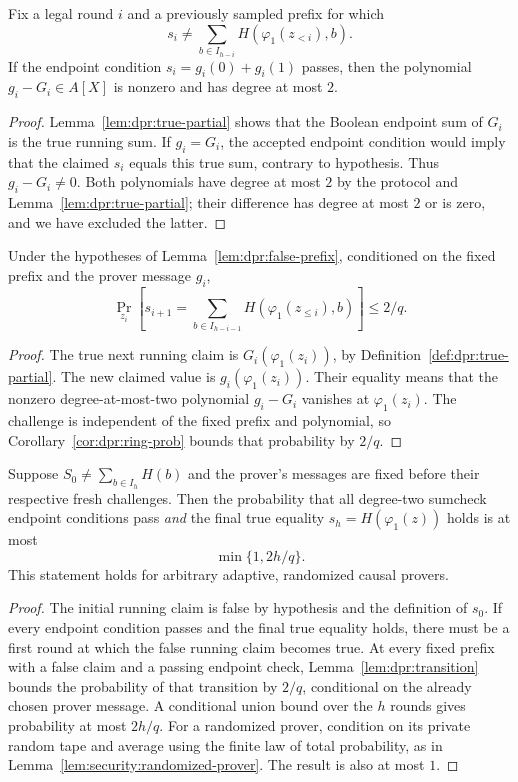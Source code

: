 \begin{lemma}\label{lem:dpr:false-prefix}
Fix a legal round $i$ and a previously
sampled prefix for which
\[
 s_i\neq
 \sum_{b\in I_{h-i}}
 H(\varphi_1(z_{<i}),b).
\]
If the endpoint condition
$s_i=g_i(0)+g_i(1)$ passes,
then the polynomial
$g_i-G_i\in A[X]$ is nonzero
and has degree at most $2$.
\end{lemma}
\begin{proof}
Lemma~\ref{lem:dpr:true-partial}
shows that the Boolean endpoint sum
of $G_i$ is the true running sum.
If $g_i=G_i$, the accepted endpoint
condition would imply that the
claimed $s_i$ equals this true sum,
contrary to hypothesis. Thus
$g_i-G_i\neq0$.
Both polynomials have degree
at most $2$ by the protocol and
Lemma~\ref{lem:dpr:true-partial};
their difference has degree
at most $2$ or is zero, and we
have excluded the latter.
\end{proof}

\begin{lemma}\label{lem:dpr:transition}
Under the hypotheses of
Lemma~\ref{lem:dpr:false-prefix},
conditioned on the fixed prefix and
the prover message $g_i$,
\[
 \Pr_{z_i}\left[
 s_{i+1}=
 \sum_{b\in I_{h-i-1}}
 H(\varphi_1(z_{\leq i}),b)
 \right]\leq 2/q.
\]
\end{lemma}
\begin{proof}
The true next running claim is
$G_i(\varphi_1(z_i))$, by
Definition~\ref{def:dpr:true-partial}.
The new claimed value is
$g_i(\varphi_1(z_i))$.
Their equality means that
the nonzero degree-at-most-two
polynomial $g_i-G_i$ vanishes
at $\varphi_1(z_i)$.
The challenge is independent
of the fixed prefix and polynomial,
so Corollary~\ref{cor:dpr:ring-prob}
bounds that probability by $2/q$.
\end{proof}

\begin{theorem}\label{thm:dpr:sumcheck-sound}
Suppose $S_0\neq
\sum_{b\in I_h}H(b)$ and the prover's
messages are fixed before their
respective fresh challenges.
Then the probability that all
degree-two sumcheck endpoint conditions
pass \emph{and} the final true
equality $s_h=H(\varphi_1(z))$
holds is at most
\[
 \boxed{\min\{1,2h/q\}.}
\]
This statement holds for arbitrary
adaptive, randomized causal provers.
\end{theorem}
\begin{proof}
The initial running claim is false
by hypothesis and the definition
of $s_0$. If every endpoint condition
passes and the final true equality
holds, there must be a first round
at which the false running claim
becomes true. At every fixed prefix
with a false claim and a passing
endpoint check,
Lemma~\ref{lem:dpr:transition}
bounds the probability of that
transition by $2/q$,
conditional on the already chosen
prover message. A conditional
union bound over the $h$ rounds
gives probability at most $2h/q$.
For a randomized prover, condition
on its private random tape and
average using the finite law of total
probability, as in
Lemma~\ref{lem:security:randomized-prover}.
The result is also at most $1$.
\end{proof}
